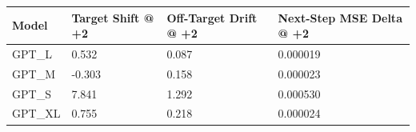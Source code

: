 \begin{tabular}{llll}
\toprule
Model & Target Shift @ +2 & Off-Target Drift @ +2 & Next-Step MSE Delta @ +2 \\
\midrule
GPT\_L & 0.532 & 0.087 & 0.000019 \\
GPT\_M & -0.303 & 0.158 & 0.000023 \\
GPT\_S & 7.841 & 1.292 & 0.000530 \\
GPT\_XL & 0.755 & 0.218 & 0.000024 \\
\bottomrule
\end{tabular}
